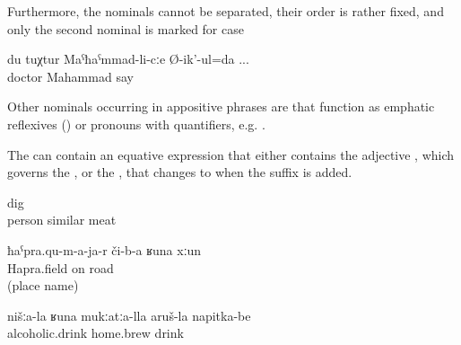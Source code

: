 Furthermore, the nominals cannot be separated, their order is rather fixed, and only the second nominal is marked for case 
%
\begin{exe}
	\ex	\label{ex:I say to Doctor Mahammad}
	\gll	du	tuχtur	Maˁħaˁmmad-li-cːe	Ø-ik'-ul=da ...\\
			doctor		Mahammad	say\\
	\glt	{}
\end{exe}

Other nominals occurring in appositive phrases are  that function as emphatic reflexives () or pronouns with quantifiers, e.g.  .

The  can contain an equative expression that either contains the adjective , which governs the  , or the   ,  that changes to  when the suffix  is added.
%
\begin{exe}

		\ex	\label{ex:meat similar to human (flesh)}
			dig\\
			person	similar	meat\\
		\glt	{}
		
		
		\ex	\label{ex:a road like through hapraqu@9a}
		\gll	ħaˁpra.qu-m-a-ja-r	či-b-a	ʁuna	xːun\\
			Hapra.field	on		road\\
		\glt	{} (place name)

	
		\ex	\label{ex:drinks like our alcoholic homebrew}
		\gll	nišːa-la	ʁuna	mukːatːa-lla	aruš-la	napitka-be\\
					alcoholic.drink\tsc{-gen}	home.brew	drink \\
		\glt	{}

\end{exe}

